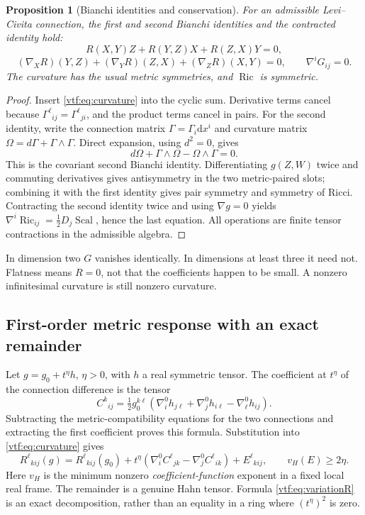 \documentclass[11pt,letterpaper]{article}
\newtheorem{proposition}[theorem]{Proposition}
\theoremstyle{definition}
\theoremstyle{remark}
\newcommand{\Ric}{\operatorname{Ric}}\newcommand{\Scal}{\operatorname{Scal}}
\newcommand{\vH}{v_{\!H}}
\newcommand{\dd}{\mathrm d}
\begin{document}
\begin{proposition}[Bianchi identities and conservation]
For an admissible Levi--Civita connection, the first and second Bianchi
identities and the contracted identity hold:
\[
 R(X,Y)Z+R(Y,Z)X+R(Z,X)Y=0,
\]
\[
 (\nabla_XR)(Y,Z)+(\nabla_YR)(Z,X)+(\nabla_ZR)(X,Y)=0,
 \qquad \nabla^iG_{ij}=0.
\]
The curvature has the usual metric symmetries, and $\Ric$ is symmetric.
\end{proposition}
\begin{proof}
Insert \eqref{vtf:eq:curvature} into the cyclic sum. Derivative terms cancel
because $\Gamma^\ell{}_{ij}=\Gamma^\ell{}_{ji}$, and the product terms
cancel in pairs. For the second identity, write the connection matrix
$\Gamma=\Gamma_i\dd x^i$ and curvature matrix
$\Omega=d\Gamma+\Gamma\wedge\Gamma$. Direct expansion, using $d^2=0$,
gives
\[
 d\Omega+\Gamma\wedge\Omega-\Omega\wedge\Gamma=0.
\]
This is the covariant second Bianchi identity. Differentiating
$g(Z,W)$ twice and commuting derivatives gives antisymmetry in the two
metric-paired slots; combining it with the first identity gives pair
symmetry and symmetry of Ricci. Contracting the second identity twice and
using $\nabla g=0$ yields
$\nabla^i\Ric_{ij}=\tfrac12D_j\Scal$, hence the last equation.
All operations are finite tensor contractions in the admissible algebra.
\end{proof}

In dimension two $G$ vanishes identically. In dimensions at least three it
need not. Flatness means $R=0$, not that the coefficients happen to be small.
A nonzero infinitesimal curvature is still nonzero curvature.

\subsection{First-order metric response with an exact remainder}

Let $g=g_0+t^\eta h$, $\eta>0$, with $h$ a real symmetric tensor. The
coefficient at $t^\eta$ of the connection difference is the tensor
\begin{equation}\label{vtf:eq:variationGamma}
 C^k{}_{ij}=\tfrac12g_0^{k\ell}
 (\nabla^0_i h_{j\ell}+\nabla^0_j h_{i\ell}-\nabla^0_\ell h_{ij}).
\end{equation}
Subtracting the metric-compatibility equations for the two connections and
extracting the first coefficient proves this formula. Substitution into
\eqref{vtf:eq:curvature} gives
\begin{equation}\label{vtf:eq:variationR}
 R^\ell{}_{kij}(g)=R^\ell{}_{kij}(g_0)
 +t^\eta(\nabla^0_i C^\ell{}_{jk}-\nabla^0_j C^\ell{}_{ik})
 +E^\ell{}_{kij},\qquad \vH(E)\ge2\eta.
\end{equation}
Here $\vH$ is the minimum nonzero \emph{coefficient-function} exponent in
a fixed local real frame. The remainder is a genuine Hahn tensor. Formula
\eqref{vtf:eq:variationR} is an exact decomposition, rather than an equality in
a ring where $(t^\eta)^2$ is zero.
\end{document}
